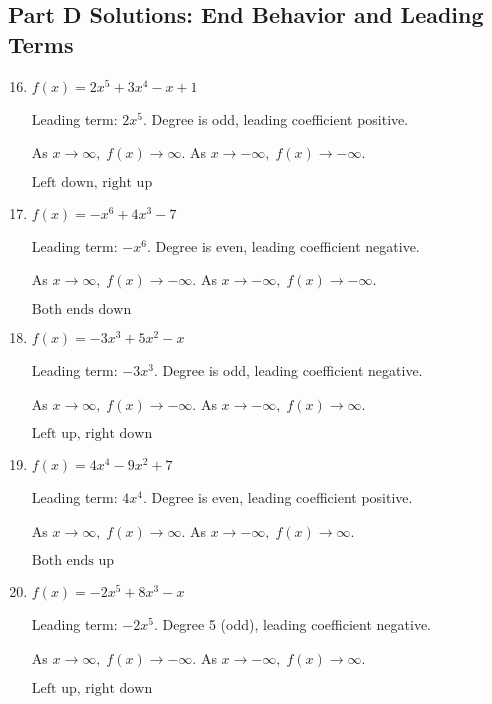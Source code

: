 \documentclass[12pt]{article}
\begin{document}
\subsection*{Part D Solutions: End Behavior and Leading Terms}
\begin{enumerate}
  \setcounter{enumi}{15}
  \item \(f(x) = 2x^5 + 3x^4 - x + 1\)

  Leading term: \(2x^5.\)  
  Degree is odd, leading coefficient positive.

  As \(x \to \infty,\; f(x) \to \infty.\)  
  As \(x \to -\infty,\; f(x) \to -\infty.\)

  \(\boxed{\text{Left down, right up}}\)

  \item \(f(x) = -x^6 + 4x^3 - 7\)

  Leading term: \(-x^6.\)  
  Degree is even, leading coefficient negative.

  As \(x \to \infty,\; f(x) \to -\infty.\)  
  As \(x \to -\infty,\; f(x) \to -\infty.\)

  \(\boxed{\text{Both ends down}}\)

  \item \(f(x) = -3x^3 + 5x^2 - x\)

  Leading term: \(-3x^3.\)  
  Degree is odd, leading coefficient negative.

  As \(x \to \infty,\; f(x) \to -\infty.\)  
  As \(x \to -\infty,\; f(x) \to \infty.\)

  \(\boxed{\text{Left up, right down}}\)

  \item \(f(x) = 4x^4 - 9x^2 + 7\)

  Leading term: \(4x^4.\)  
  Degree is even, leading coefficient positive.

  As \(x \to \infty,\; f(x) \to \infty.\)  
  As \(x \to -\infty,\; f(x) \to \infty.\)

  \(\boxed{\text{Both ends up}}\)

  \item \(f(x) = -2x^5 + 8x^3 - x\)

  Leading term: \(-2x^5.\)  
  Degree 5 (odd), leading coefficient negative.

  As \(x \to \infty,\; f(x) \to -\infty.\)  
  As \(x \to -\infty,\; f(x) \to \infty.\)

  \(\boxed{\text{Left up, right down}}\)
\end{enumerate}
\end{document}
